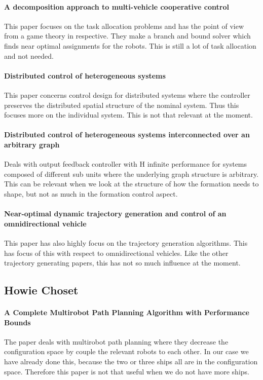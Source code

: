 {\vskip0pt\color{gray}
\paragraph{A decomposition approach to multi-vehicle cooperative control}
This paper focuses on the task allocation problems and has the point of view from a game theory in respective. They make a branch and bound solver which finds near optimal assignments for the robots.
This is still a lot of task allocation and not needed.}

\paragraph{Distributed control of heterogeneous systems}
This paper concerns control design for distributed systems where the controller preserves the distributed spatial structure of the nominal system. Thus this focuses more on the individual system.
This is not that relevant at the moment.

\paragraph{Distributed control of heterogeneous systems interconnected over an arbitrary graph}
Deals with output feedback controller with H infinite performance for systems composed of different sub units where the underlying graph structure is arbitrary.
This can be relevant when we look at the structure of how the formation needs to shape, but not as much in the formation control aspect.

\paragraph{Near-optimal dynamic trajectory generation and control of an omnidirectional vehicle}
This paper has also highly focus on the trajectory generation algorithms. This has focus of this with respect to omnidirectional vehicles.
Like the other trajectory generating papers, this has not so much influence at the moment.


\subsection{Howie Choset}

\paragraph{A Complete Multirobot Path Planning Algorithm with Performance Bounds}
The paper deals with multirobot path planning where they decrease the configuration space by couple the relevant robots to each other. In our case we have already done this, because the two or three ships all are in the configuration space.
Therefore this paper is not that useful when we do not have more ships.

